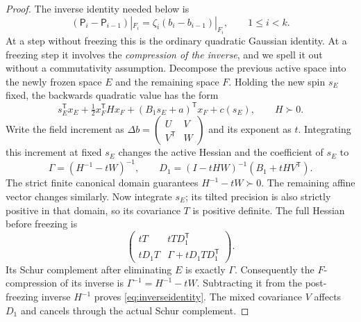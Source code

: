 \documentclass[11pt]{article}
\numberwithin{equation}{section}
\theoremstyle{definition}
\begin{document}
\begin{proof}
The inverse identity needed below is
\begin{equation}\label{eq:inverseidentity}
(\mathsf P_i-\mathsf P_{i-1})|_{F_i}
=\zeta_i(b_i-b_{i-1})|_{F_i},\qquad 1\le i<k.
\end{equation}
At a step without freezing this is the ordinary quadratic Gaussian identity. At a freezing step it involves the \emph{compression of the inverse}, and we spell it out without a commutativity assumption. Decompose the previous active space into the newly frozen space $E$ and the remaining space $F$. Holding the new spin $s_E$ fixed, the backwards quadratic value has the form
\[
s_E^{\mathsf T}x_E+\tfrac12x_F^{\mathsf T}H x_F
+(B_1s_E+a)^{\mathsf T}x_F+c(s_E),\qquad H\succ0.
\]
Write the field increment as
$\Delta b=\left(\begin{smallmatrix}U&V\\V^{\mathsf T}&W\end{smallmatrix}\right)$
and its exponent as $t$. Integrating this increment at fixed $s_E$ changes the active Hessian and the coefficient of $s_E$ to
\[
\Gamma=(H^{-1}-tW)^{-1},\qquad
D_1=(I-tHW)^{-1}(B_1+tHV^{\mathsf T}).
\]
The strict finite canonical domain guarantees $H^{-1}-tW\succ0$. The remaining affine vector changes similarly. Now integrate $s_E$; its tilted precision is also strictly positive in that domain, so its covariance $T$ is positive definite. The full Hessian before freezing is
\begin{equation}\label{eq:Schurmatrix}
\begin{pmatrix}
tT&tTD_1^{\mathsf T}\\
tD_1T&\Gamma+tD_1TD_1^{\mathsf T}
\end{pmatrix}.
\end{equation}
Its Schur complement after eliminating $E$ is exactly $\Gamma$. Consequently the $F$-compression of its inverse is $\Gamma^{-1}=H^{-1}-tW$. Subtracting it from the post-freezing inverse $H^{-1}$ proves \eqref{eq:inverseidentity}. The mixed covariance $V$ affects $D_1$ and cancels through the actual Schur complement.


\end{proof}
\end{document}
